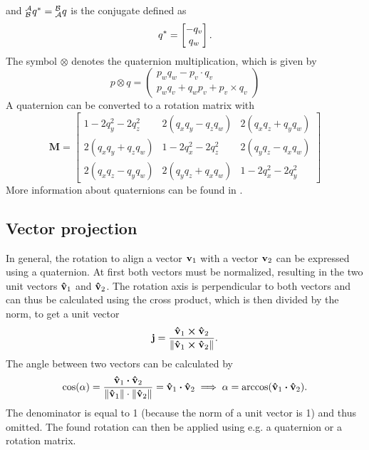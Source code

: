 and $\qtf{a}{b}^* = \qtf{b}{a}$ is the conjugate defined as
\begin{equation}
    \qtf{}{}^* = \begin{bmatrix}
        -q_v \\
        q_w
    \end{bmatrix}.
\end{equation}
The symbol $\otimes$ denotes the quaternion multiplication, which is given by
\begin{equation}
    p \otimes q=\left(\begin{array}{c}
            p_{w} q_{w}-p_v \cdot q_v \\
            p_{w} q_v+q_{w} p_v+p_v \times q_v
        \end{array}\right)
\end{equation}
A quaternion can be converted to a rotation matrix with
\begin{equation}
    \mathbf{M} =
    \left[
        \begin{array}{ccc}
            1 - 2q_y^2-2 q_z^2   & 2(q_x q_y- q_z q_w) & 2(q_x q_z + q_y q_w) \\
            2(q_x q_y + q_z q_w) & 1-2 q_x^2-2 q_z^2   & 2(q_y q_z -q_x q_w)  \\
            2(q_x q_z-q_y q_w)   & 2(q_y q_z+ q_x q_w) & 1 - 2 q_x^2- 2 q_y^2
        \end{array}
        \right]
\end{equation}
More information about quaternions can be found in \cite{Kok2017,Trawny2005}.\\

\subsection{Vector projection}
\label{subsec:vector_projection}
In general, the rotation to align a vector $\vb{v}_1$ with a vector $\vb{v}_2$ can be expressed using a quaternion.
At first both vectors must be normalized, resulting in the two unit vectors $\vu{v}_1$ and $\vu{v}_2$.
The rotation axis is perpendicular to both vectors and can thus be calculated using the cross product, which is then divided by the norm, to get a unit vector
\begin{equation}
    \vb{j} = \frac{\vu{v}_1 \cp \vu{v}_2}{\norm{\vu{v}_1 \cp \vu{v}_2}}.
\end{equation}
The angle between two vectors can be calculated by
\begin{equation}
    \cos(\alpha) = \frac{\vu{v}_1 \vdot \vu{v}_2}{\norm{\vu{v}_1} \cdot \norm{\vu{v}_2}}
    = \vu{v}_1 \vdot \vu{v}_2 \implies
    \alpha = \arccos(\vu{v}_1 \vdot \vu{v}_2).
\end{equation}
The denominator is equal to 1 (because the norm of a unit vector is 1) and thus omitted.
The found rotation can then be applied using e.g. a quaternion or a rotation matrix.



